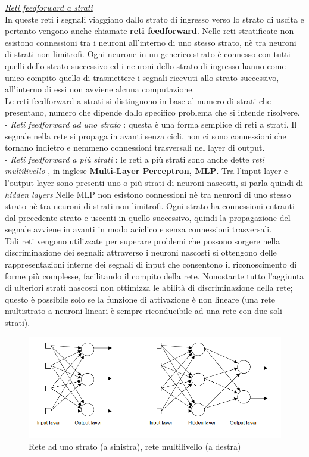 \documentclass[12pt,a4paper,oneside]{book}
\begin{document}
		\underline{\emph{Reti feedforward a strati}}\\
		In queste reti i segnali viaggiano dallo strato di ingresso verso lo strato di uscita e pertanto vengono anche chiamate \textbf{reti feedforward}. Nelle reti stratificate non esistono connessioni tra i neuroni all'interno di uno stesso strato, nè tra neuroni di strati non limitrofi. Ogni neurone in un generico strato è connesso con tutti quelli dello strato successivo ed i neuroni dello strato di ingresso hanno come unico compito quello di trasmettere i segnali ricevuti allo strato successivo, all'interno di essi non avviene alcuna computazione.\\
		Le reti feedforward a strati si distinguono in base al numero di strati che presentano, numero che dipende dallo specifico problema che si intende risolvere.\\ 
		- \emph{Reti feedforward ad uno strato} : questa è una forma semplice di reti a strati. Il segnale nella rete si propaga in avanti senza cicli, non ci sono connessioni che tornano indietro e nemmeno connessioni trasversali nel layer di output.\\
		- \emph{Reti feedforward a più strati }: le reti a più strati sono anche dette \textit{reti multilivello }, in inglese \textbf{\textit{}Multi-Layer Perceptron, MLP}. Tra l'input layer e l'output layer sono presenti uno o più strati di neuroni nascosti, si parla quindi di \textit{\textit{hidden layers}} Nelle MLP non esistono connessioni nè tra neuroni di uno stesso strato nè tra neuroni di strati non limitrofi. Ogni strato ha connessioni entranti dal precedente strato e uscenti in quello successivo, quindi la propagazione del segnale avviene in avanti in modo aciclico e senza connessioni trasversali.\\
		Tali reti vengono utilizzate per superare problemi che possono sorgere nella discriminazione dei segnali: attraverso i neuroni nascosti si ottengono delle rappresentazioni interne dei segnali di input che consentono il riconoscimento di forme più complesse, facilitando il compito della rete. 
		Nonostante tutto l’aggiunta di ulteriori strati nascosti non ottimizza le abilità di discriminazione della rete; questo è possibile solo se la funzione di attivazione è non lineare (una rete multistrato a neuroni lineari è sempre riconducibile ad una rete con due soli strati).
		
		\begin{figure}[h]
			\centering
			\includegraphics[width=0.95\linewidth]{IMMAGINI/unostrato}
			\caption{Rete ad uno strato (a sinistra), rete multilivello (a destra)}
			\label{fig:multistrato}
		\end{figure}
	
\end{document}
